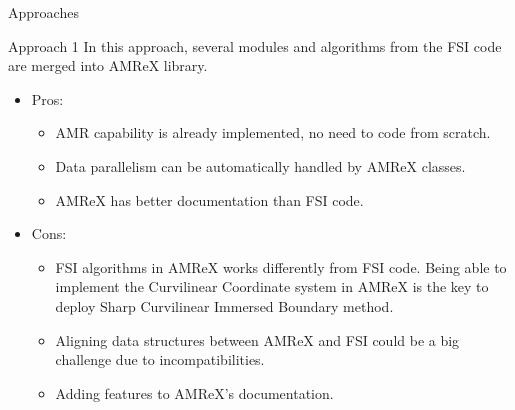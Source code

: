 \documentclass[\string~/GitHub/sthlmNordBeamerTheme/sthlmNordLightDemo.tex]{subfiles}
\begin{document}
\begin{frame}[c]{Approaches}
    
    \begin{block}{Approach 1}
        In this approach, several modules and algorithms from the FSI code are merged into AMReX library.
    \end{block}
    
    \begin{itemize}
        \item Pros:
            \begin{itemize}
                \item AMR capability is already implemented, no need to code from scratch.
                \item Data parallelism can be automatically handled by AMReX classes.
                \item AMReX has better documentation than FSI code.
            \end{itemize}
        \item Cons:
            \begin{itemize}
                \item FSI algorithms in AMReX works differently from FSI code. Being able to implement the Curvilinear Coordinate system in AMReX is the key to deploy Sharp Curvilinear Immersed Boundary method.
                \item Aligning data structures between AMReX and FSI could be a big challenge due to incompatibilities.
                \item Adding features to AMReX's documentation.
            \end{itemize}
    \end{itemize}
 
\end{frame}
\end{document}
